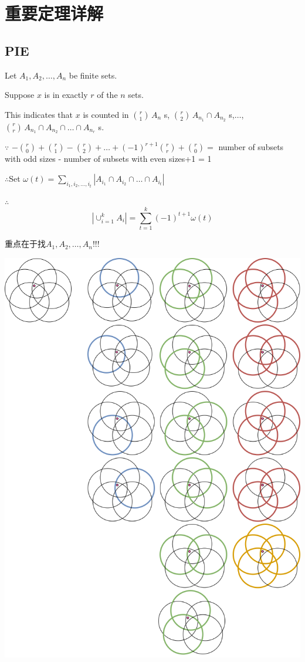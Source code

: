 \documentclass[12pt,a4paper]{ctexrep}
\begin{document}
\section{重要定理详解}
\subsection{PIE}
Let $A_{1}, A_{2}, \dots , A_{n}$ be finite sets.

Suppose $x$ is in exactly $r$ of the $n$ sets.

This indicates that $x$ is counted in $\binom{r}{1} \, A_{n}$ s, $\binom{r}{2} \, A_{n_{1}}\cap A_{n_{2}}$ s,$\dots$, $\binom{r}{r} \, A_{n_{1}}\cap A_{n_{2}} \cap \dots \cap A_{n_{r}}$ s.

$\because$ $-\binom{r}{0}+\binom{r}{1}-\binom{r}{2}+\dots+(-1)^{r+1}\binom{r}{r} +\binom{r}{0}= $ number of subsets with odd sizes - number of subsets with even sizes+1 = 1

$\therefore$Set $\omega(t) = \sum_{i_{1},i_{2},\dots,i_{t}}|A_{i_{1}} \cap A_{i_{2}} \cap \dots \cap A_{i_{t}}|$

$\therefore$ \[|\cup_{i=1}^{k} A_{i}| = \sum_{t=1}^{k} (-1)^{t+1} \omega(t)\]

重点在于找$A_{1},A_{2},\dots,A_{n}$!!!\\

\begin{center}
\includegraphics[scale=0.3]{PIE.png}
\end{center}
\end{document}
